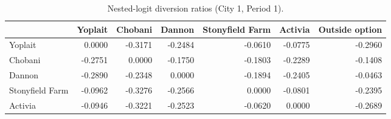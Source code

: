 \begin{table}[H]
\centering
\caption{Nested-logit diversion ratios (City 1, Period 1).}
\label{tab:q21_div}
\begin{tabular}{lrrrrrr}
\toprule
 & Yoplait & Chobani & Dannon & Stonyfield Farm & Activia & Outside option \\
\midrule
Yoplait & 0.0000 & -0.3171 & -0.2484 & -0.0610 & -0.0775 & -0.2960 \\
Chobani & -0.2751 & 0.0000 & -0.1750 & -0.1803 & -0.2289 & -0.1408 \\
Dannon & -0.2890 & -0.2348 & 0.0000 & -0.1894 & -0.2405 & -0.0463 \\
Stonyfield Farm & -0.0962 & -0.3276 & -0.2566 & 0.0000 & -0.0801 & -0.2395 \\
Activia & -0.0946 & -0.3221 & -0.2523 & -0.0620 & 0.0000 & -0.2689 \\
\bottomrule
\end{tabular}
\end{table}
